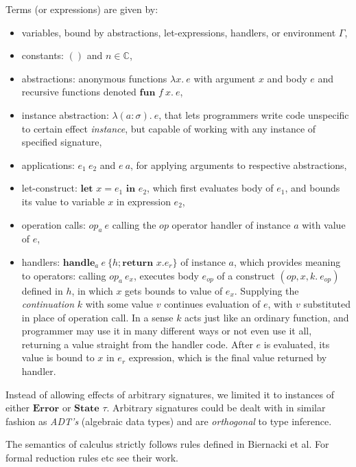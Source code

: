 \documentclass[declaration,shortabstract]{iithesis}
\newcommand{\lam}[1][x]{\ensuremath{\lambda #1.\:}}
\begin{document}
Terms (or expressions) are given by:
\begin{itemize}
    \item variables, bound by abstractions, let-expressions, handlers, or environment $\Gamma$,
    \item constants: $()$ and $n \in \mathbb{C}$,
    \item abstractions: anonymous functions $\lam e$ with argument $x$ and body $e$ and recursive functions denoted $\textbf{fun }f\:x.\:e$,
    \item instance abstraction: $\lam[(a:\sigma)]e$, that lets programmers write code
    unspecific to certain effect \textit{instance}, but capable of working with any
    instance of specified signature,
    \item applications: $e_1\:e_2$ and $e\:a$, for applying arguments to respective abstractions, 
    \item let-construct: $\textbf{let } x = e_1 \textbf{ in } e_2$, which first evaluates body of $e_1$,
    and bounds its value to variable $x$ in expression $e_2$,
    \item operation calls: $op_a\:e$ calling the $op$ operator handler of instance $a$ with value
    of $e$,
    \item handlers: $\textbf{handle}_a \: e\: \{h;\textbf{return } x. e_r\}$ of instance $a$, 
    which provides meaning to operators: calling $op_a\:e_x$, executes body $e_{op}$ of
    a construct $(op, x, k.\:e_{op})$ defined in $h$, in which $x$ gets bounds to value of $e_x$.
    Supplying the \textit{continuation} $k$ with some value $v$ continues evaluation of $e$,
    with $v$ substituted in place of operation call.
    In a sense $k$ acts just like an ordinary function, and programmer may use it
    in many different ways or not even use it all, returning a value straight from the handler code.
    After $e$ is evaluated, its value is bound to $x$ in $e_r$ expression,
    which is the final value returned by handler.

\end{itemize}

Instead of allowing effects of arbitrary signatures, we limited it to instances
of either $\textbf{Error}$ or  $\textbf{State }\tau$.
Arbitrary signatures could be dealt with in similar fashion as \textit{ADT's}
(algebraic data types) and are \textit{orthogonal} to type inference.

The semantics of calculus strictly follows rules defined in Biernacki et al\cite{binders-labels}.
For formal reduction rules etc see their work.
\end{document}
